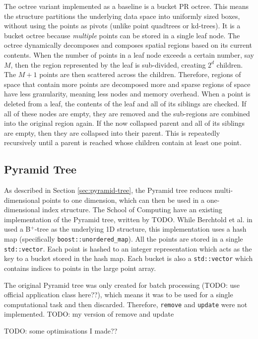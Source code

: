 The octree variant implemented as a baseline is a bucket PR octree. This means the structure partitions the underlying data space into uniformly sized boxes, without using the points as pivots (unlike point quadtrees or kd-trees). It is a bucket octree because \textit{multiple} points can be stored in a single leaf node. The octree dynamically decomposes and composes spatial regions based on its current contents. When the number of points in a leaf node exceeds a certain number, say $M$, then the region represented by the leaf is sub-divided, creating $2^d$ children. The $M + 1$ points are then scattered across the children. Therefore, regions of space that contain more points are decomposed more and sparse regions of space have less granularity, meaning less nodes and memory overhead. When a point is deleted from a leaf, the contents of the leaf and all of its siblings are checked. If all of these nodes are empty, they are removed and the sub-regions are combined into the original region again. If the now collapsed parent and all of its siblings are empty, then they are collapsed into their parent. This is repeatedly recursively until a parent is reached whose children contain at least one point.

\subsection{Pyramid Tree}

As described in Section \ref{sec:pyramid-tree}, the Pyramid tree reduces multi-dimensional points to one dimension, which can then be used in a one-dimensional index structure. The School of Computing have an existing implementation of the Pyramid tree, written by TODO. While Berchtold et al. in \cite{pyramid-tree} used a B${}^{+}$-tree as the underlying 1D structure, this implementation uses a hash map (specifically \texttt{boost::unordered\_map}). All the points are stored in a single \texttt{std::vector}. Each point is hashed to an integer representation which acts as the key to a bucket stored in the hash map. Each bucket is also a \texttt{std::vector} which contains indices to points in the large point array.

The original Pyramid tree was only created for batch processing (TODO: use official application class here??), which means it was to be used for a single computational task and then discarded. Therefore, \texttt{remove} and \texttt{update} were not implemented. TODO: my version of remove and update

TODO: some optimisations I made??

